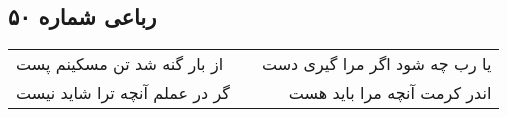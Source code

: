 \begin{center}
\section*{رباعی شماره ۵۰}
\label{sec:sh050}
\begin{longtable}{l p{0.5cm} r}
از بار گنه شد تن مسکینم پست
&&
یا رب چه شود اگر مرا گیری دست
\\
گر در عملم آنچه ترا شاید نیست
&&
اندر کرمت آنچه مرا باید هست
\\
\end{longtable}
\end{center}
